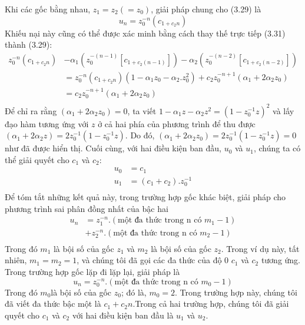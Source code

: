 \documentclass[12pt, a4paper,oneside]{book}
\theoremstyle{definition}
\begin{document}
Khi các gốc bằng nhau, $z_{1}=z_{2} (=z_{0})$, giải pháp chung cho (3.29) là
$$u_{n}= z_{0}^{-n} (c_{1 +c_{2}n})$$
Khiếu nại này cũng có thể được xác minh bằng cách thay thế trực tiếp (3.31) thành (3.29):
\begin{align*}
z_{0}^{-n} (c_{1 +c_{2}n})&- \alpha_{1}(z_{0}^{-(n-1)} [c_{1 + c_{2} (n-1)}]) - \alpha_{2}(z_{0}^{-(n-2)} [c_{1 + c_{2} (n-2)}])\\
&=z_{0}^{-n} (c_{1 +c_{2}n})(1-\alpha_{1}z_{0}-\alpha_{2}. z_{0}^{2}) + c_{2} z_{0}^{-n+1} (\alpha_{1}+2\alpha_{2}z_{0})\\
&=c_{2} z_{0}^{-n+1} (\alpha_{1}+2\alpha_{2}z_{0})\\
\end{align*}
Để chỉ ra rằng $(\alpha_{1}+2\alpha_{2}z_{0})=0$, ta viết $ 1-\alpha_{1}z-\alpha_{2}z^{2}=(1-z_{0}^{-1}z)^{2}$ và lấy đạo hàm tương ứng với $z$ ở cả hai phía của phương trình để thu được $ (\alpha_{1}+2\alpha_{2}z)=2z_{0}^{-1} (1-z_{0}^{-1}z)$. Do đó, $(\alpha_{1}+2\alpha_{2}z_{0})=2z_{0}^{-1} (1-z_{0}^{-1}z)=0$ như đã được hiển thị. Cuối cùng, với hai điều kiện ban đầu, $u_{0}$ và $u_{1}$, chúng ta có thể giải quyết cho $c_{1}$ và $c_{2}$:
\begin{align*}
u_{0}&= c_{1}\\
u_{1}&=(c_{1}+ c_{2}). z_{0}^{-1}\\
\end{align*}
Để tóm tắt những kết quả này, trong trường hợp gốc khác biệt, giải pháp cho phương trình sai phân đồng nhất của bậc hai 
\begin{align*}
u_{n}&= z_{1}^{-n} .( \text{một đa thức trong n có }  m_{1}-1) \\
& + z_{2}^{-n} .( \text{một đa thức trong n có }  m_{2}-1) \\
\end{align*}
Trong đó $m_{1}$ là bội số của gốc $z_{1}$ và $m_{2}$ là bội số của gốc $z_{2}$. Trong ví dụ này, tất nhiên, $m_{1}=m_{2}=1$, và chúng tôi đã gọi các đa thức của độ 0 $c_{1}$ và $c_{2}$ tương ứng. Trong trường hợp gốc lặp đi lặp lại, giải pháp là
$$u_{n}= z_{0}^{-n} .( \text{một đa thức trong n có }  m_{0}-1)$$
Trong đó $m_{0}$là bội số của gốc $z_{0}$; đó là, $m_{0}=2$. Trong trường hợp này, chúng tôi đã viết đa thức bậc một là $c_{1}+c_{2}n$.Trong cả hai trường hợp, chúng tôi đã giải quyết cho $c_{1}$ và $c_{2}$ với hai điều kiện ban đầu là $u_{1}$ và $u_{2}$.	
\end{document}
